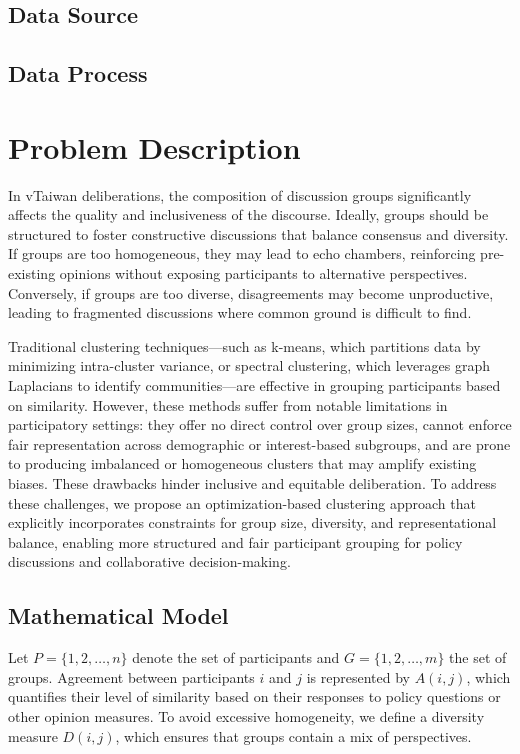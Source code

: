 \documentclass[11pt,a4paper]{article}
\begin{document}
\subsection{Data Source}


\subsection{Data Process}

\section{Problem Description}
\label{sec-problem}

In vTaiwan deliberations, the composition of discussion groups significantly affects the quality and inclusiveness of the discourse. Ideally, groups should be structured to foster constructive discussions that balance consensus and diversity. If groups are too homogeneous, they may lead to echo chambers, reinforcing pre-existing opinions without exposing participants to alternative perspectives. Conversely, if groups are too diverse, disagreements may become unproductive, leading to fragmented discussions where common ground is difficult to find.

Traditional clustering techniques—such as k-means, which partitions data by minimizing intra-cluster variance, or spectral clustering, which leverages graph Laplacians to identify communities—are effective in grouping participants based on similarity. However, these methods suffer from notable limitations in participatory settings: they offer no direct control over group sizes, cannot enforce fair representation across demographic or interest-based subgroups, and are prone to producing imbalanced or homogeneous clusters that may amplify existing biases. These drawbacks hinder inclusive and equitable deliberation. To address these challenges, we propose an optimization-based clustering approach that explicitly incorporates constraints for group size, diversity, and representational balance, enabling more structured and fair participant grouping for policy discussions and collaborative decision-making. %

\subsection{Mathematical Model}
\label{sec-model}

Let \( P = \{1, 2, \dots, n\} \) denote the set of participants and \( G = \{1, 2, \dots, m\} \) the set of groups. Agreement between participants \( i \) and \( j \) is represented by \( A(i, j) \), which quantifies their level of similarity based on their responses to policy questions or other opinion measures. To avoid excessive homogeneity, we define a diversity measure \( D(i, j) \), which ensures that groups contain a mix of perspectives.
\end{document}
